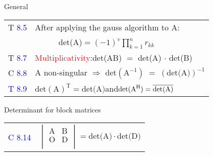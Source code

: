 \begin{mainbox}{General}
\begin{tabular}{rrl}
	\rule{0pt}{3ex}
	\textcolor{blue}{T 8.5} & \multicolumn{2}{l}{After applying the gauss algorithm to A:}\\
	\multicolumn{3}{c}{det(A)$=(-1)^v\displaystyle\prod_{k=1}^n r_{kk}$}\\
	\rule{0pt}{3ex}
	\textcolor{blue}{T 8.7} & \multicolumn{2}{l}{\textcolor{red}{Multiplicativity}:\quad det(AB) $=$ det(A) $\cdot$ det(B)}\\
	\rule{0pt}{3ex}
	\textcolor{blue}{C 8.8} & \multicolumn{2}{l}{A non-singular $\Rightarrow$ det$(\text{A}^{-1})\;=\;(\text{det(A)})^{-1}$}\\
	\rule{0pt}{3ex}
	\textcolor{blue}{T 8.9} & \multicolumn{2}{l}{$\text{det}(\text{A})^\text{T} = \text{det(A)}$\quad and\quad$\text{det}(\text{A}^\text{H}) = \overline{\text{det(A)}}$}\\
\end{tabular}
\end{mainbox}

\begin{howtobox}{Determinant for block matrices}
\setlength{\tabcolsep}{2pt}
\begin{tabular}{rl}
	\textcolor{blue}{C 8.14} & $\begin{vmatrix}
		\text{A} & \text{B} \\
		\text{O} & \text{D} \\
	\end{vmatrix} = \text{det(A)}\cdot\text{det(D)}$\\
\end{tabular}
\end{howtobox}